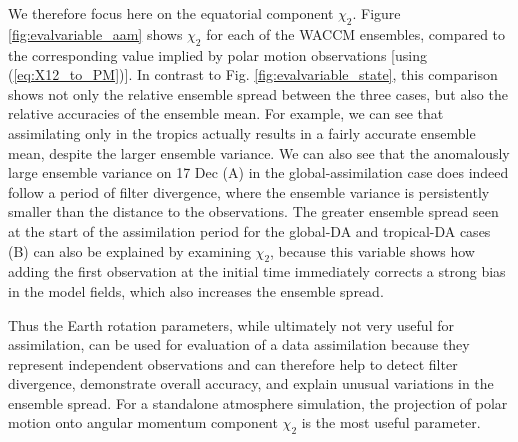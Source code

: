 We therefore focus here on the equatorial component $\chi_2$.
Figure \ref{fig:evalvariable_aam} shows $\chi_2$ for each of the WACCM ensembles, compared to the corresponding value implied by polar motion observations [using (\ref{eq:X12_to_PM})]. 
In contrast to Fig. \ref{fig:evalvariable_state}, this comparison shows not only the relative ensemble spread between the three cases, but also the relative accuracies of the ensemble mean. 
For example, we can see that assimilating only in the tropics actually results in a fairly accurate ensemble mean, despite the larger ensemble variance. 
We can also see that the anomalously large ensemble variance on 17 Dec (A) in the global-assimilation case does indeed follow a period of filter divergence, where the ensemble variance is persistently smaller than the distance to the observations. 
The greater ensemble spread seen at the start of the assimilation period for the global-DA and tropical-DA cases (B) can also be explained by examining $\chi_2$, because this variable shows how adding the first observation at the initial time immediately corrects 
a strong bias in the model fields, which also increases the ensemble spread. 

Thus the Earth rotation parameters, while ultimately not very useful for assimilation, can be used for evaluation of a data assimilation because they represent independent observations and can therefore help to detect filter divergence, demonstrate overall accuracy, and explain unusual variations in the ensemble spread. 
For a standalone atmosphere simulation, the projection of polar motion onto angular momentum component $\chi_2$ is the most useful parameter. 
